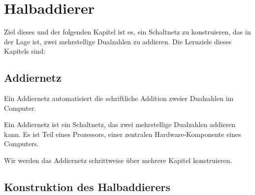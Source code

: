 
\toggletrue{image}
\toggletrue{imagehover}

\chapter{Halbaddierer}
\label{ch:halbaddierer}

Ziel dieses und der folgenden Kapitel ist es, ein Schaltnetz zu konstruieren, das in der Lage ist, zwei mehrstellige Dualzahlen zu addieren. Die Lernziele dieses Kapitels sind:\\


\section{Addiernetz}

Ein Addiernetz automatisiert die schriftliche Addition zweier Dualzahlen im Computer.

\begin{definition}[Addiernetz]
Ein Addiernetz ist ein Schaltnetz, das zwei mehrstellige Dualzahlen addieren kann. Es ist Teil eines Prozessors, einer zentralen Hardware-Komponente eines Computers.
\end{definition}

Wir werden das Addiernetz schrittweise über mehrere Kapitel konstruieren. 

\section{Konstruktion des Halbaddierers}

